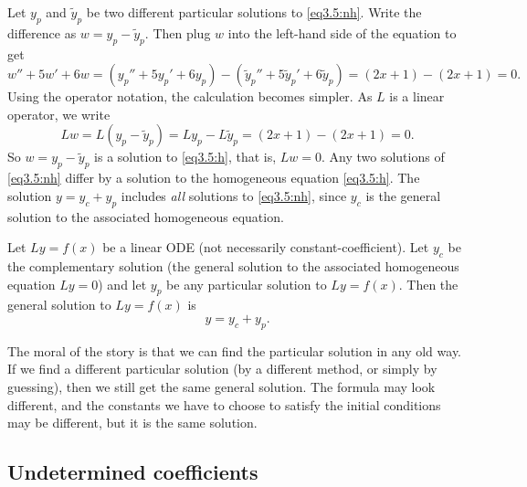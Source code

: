 Let $y_p$ and $\tilde{y}_p$ be two different
particular solutions 
to \eqref{eq3.5:nh}.
Write the difference as
$w = y_p - \tilde{y}_p$.  Then plug $w$
into the left-hand side of the equation to get
\begin{equation*}
w'' + 5w'+ 6w =
(y_p'' + 5y_p'+ 6y_p) -
(\tilde{y}_p'' + 5\tilde{y}_p'+ 6\tilde{y}_p) =
(2x+1) - (2x+1) = 0 .
\end{equation*}
Using the operator notation, the calculation becomes simpler.
As $L$ is a linear operator, we write
\begin{equation*}
Lw = L(y_p - \tilde{y}_p) =
Ly_p - L\tilde{y}_p =
(2x+1)-(2x+1) = 0 .
\end{equation*}
So $w = y_p - \tilde{y}_p$ is a solution to \eqref{eq3.5:h}, that is,
$Lw = 0$.  Any two
solutions of \eqref{eq3.5:nh} differ by a solution to the homogeneous
equation \eqref{eq3.5:h}.  The solution $y = y_c + y_p$ includes \emph{all}
solutions to \eqref{eq3.5:nh},
since $y_c$ is the general solution to the associated homogeneous equation.

\begin{theorem}
Let $Ly=f(x)$ be a linear ODE (not necessarily constant-coefficient).  Let $y_c$ be the complementary solution
(the general
solution to the associated homogeneous equation $Ly = 0$) and let $y_p$
be any particular solution to $Ly=f(x)$.  Then the general
solution to $Ly=f(x)$ is
\begin{equation*}
y = y_c + y_p.
\end{equation*}
\end{theorem}

The moral of the story is that we can find the particular solution in any old
way.  If we find a different particular solution (by a different method,
or simply by guessing),
then we still get the same general solution.
The formula may 
look different, and the constants we have to choose to
satisfy
the initial conditions may be different, but it is the same solution.

\subsection{Undetermined coefficients}

